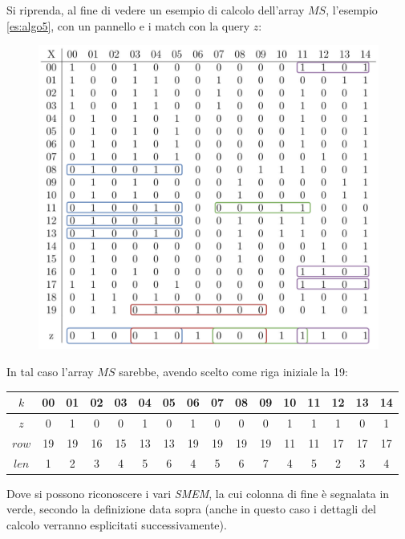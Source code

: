\begin{esempio}
  \label{es:ms}
  Si riprenda, al fine di vedere un esempio di calcolo dell'array $MS$,
  l'esempio \ref{es:algo5}, con un pannello e i match con 
  la query $z$:
  \begin{figure}[H]
    \centering
    \includegraphics[scale = 0.365]{img/pbwtmatch.pdf}
  \end{figure}
  In tal caso l'array $MS$ sarebbe, avendo scelto come riga iniziale la 19:
  \begin{table}[H]
    \footnotesize{}
    \centering
    \begin{tabular}{c|ccccccccccccccc}
      $k$ & 00 & 01 & 02 & 03 & 04 &  {\color{nordgreen}05} & 06 & 07 & 08
      &  {\color{nordgreen}09} & 10 &  {\color{nordgreen}11} & 12 & 13
      &  {\color{nordgreen}14} \\
      \hline
      \hline
      $z$ & 0 & 1 & 0 & 0 & 1 &  {\color{nordgreen}0} & 1 & 0 & 0
      &  {\color{nordgreen}0} & 1 &  {\color{nordgreen}1} & 1 & 0
      &  {\color{nordgreen}1} \\
      \hline
      $row$ & 19 & 19 & 16 & 15 & 13 &  {\color{nordgreen}13} & 19 & 19 & 19
      &  {\color{nordgreen}19} & 11 &  {\color{nordgreen}11} & 17 & 17
      &  {\color{nordgreen}17} \\
      $len$ & 1 & 2 & 3 & 4 & 5 & {\color{nordgreen}6} & 4 & 5 & 6
      & {\color{nordgreen}7} & 4 & {\color{nordgreen}5} & 2 & 3
      & {\color{nordgreen}4}\\
    \end{tabular}
  \end{table}
  Dove si possono riconoscere i vari \textit{SMEM}, la cui colonna di fine è
  segnalata in verde, secondo la definizione data
  sopra (anche in questo caso i dettagli del calcolo
  verranno esplicitati successivamente). 
\end{esempio}
